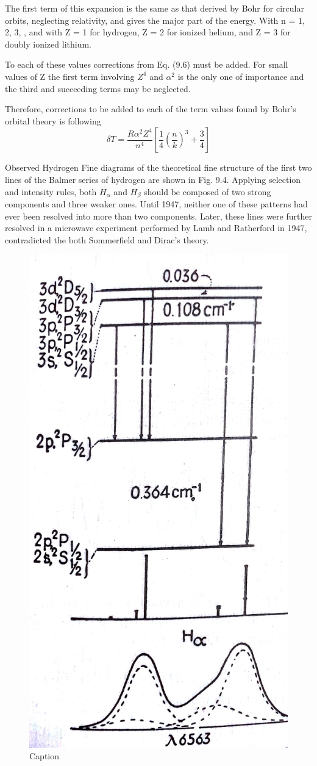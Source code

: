 \documentclass[a4paper]{article}
\begin{document}
The first term of this expansion is the same as that derived by Bohr for circular orbits, neglecting relativity, and gives the major part of the energy. With n = 1, 2, 3, , and with Z = 1 for hydrogen, Z = 2 for ionized helium, and Z = 3 for doubly ionized lithium.
                   
To each of these values corrections from Eq. (9.6) must be added. For small values of Z the first term involving $Z^4$ and $\alpha^2$ is the only one of importance and the third and succeeding terms may be neglected.

Therefore, corrections to be added to each of the term values found by Bohr's orbital theory is following
\begin{equation}
    \delta T = \frac{ R \alpha ^ { 2 } Z ^ { 4} } { n ^ { 4 } }\left[ \frac { 1 } { 4 } \left( \frac { n } { k } \right) ^ { 3 }  + \frac { 3 } { 4 }\right]
\end{equation}


Observed Hydrogen Fine diagrams of the theoretical fine structure of the first two lines of the Balmer series of hydrogen are shown in Fig. 9.4. Applying selection and intensity rules, both $H_\alpha$ and $H_\beta$ should be composed of two strong components and three weaker ones. Until 1947, neither one of these patterns had ever been resolved into more than two components. Later, these lines were further resolved in a microwave experiment performed by Lamb and Ratherford in 1947, contradicted the both Sommerfield and Dirac's theory.
\begin{figure}
    \centering
    \includegraphics[width=.4\textwidth]{fineH.jpg}
    \caption{Caption}
    \label{fig:my_label}
\end{figure}
\end{document}
